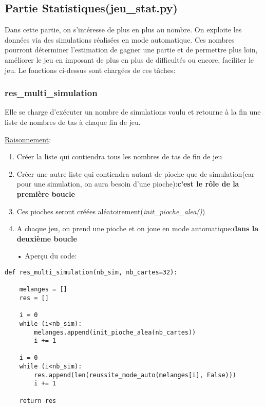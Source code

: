 \subsection{Partie Statistiques(jeu\_stat.py)}
\hspace{\parindent} Dans cette partie, on s'intéresse de plus en plus au nombre. On exploite les données via des simulations réalisées en mode automatique. Ces nombres pourront déterminer l'estimation de gagner une partie et de permettre plus loin, améliorer le jeu en imposant de plus en plus de difficultés ou encore, faciliter le jeu.
Le fonctions ci-dessus sont chargées de ces tâches:
\subsubsection{res\_multi\_simulation}
	Elle se charge d'exécuter un nombre de simulations voulu et retourne à la fin une liste de nombres de tas à chaque fin de jeu.
	\par \underline{Raisonnement}:
	\begin{enumerate}
	\item Créer la liste qui contiendra tous les nombres de tas de fin de jeu
	\item Créer une autre liste qui contiendra autant de pioche que de simulation(car pour une simulation, on aura besoin d'une pioche):\textbf{c'est le rôle de la première boucle}
	\item Ces pioches seront créées aléatoirement(\emph{init\_pioche\_alea()})
	\item A chaque jeu, on prend une pioche et on joue en mode automatique:\textbf{dans la deuxième boucle} \\
	\end{enumerate}
	\begin{itemize}
	\color{blue}\item[•]Aperçu du code:
	\end{itemize}
	
	\lstset{language=Python}
	\lstset{frame=lines}
	\lstset{basicstyle=\footnotesize}
	\begin{lstlisting}
def res_multi_simulation(nb_sim, nb_cartes=32):

    melanges = []
    res = []
    
    i = 0
    while (i<nb_sim):
        melanges.append(init_pioche_alea(nb_cartes))
        i += 1
        
    i = 0
    while (i<nb_sim):
        res.append(len(reussite_mode_auto(melanges[i], False)))
        i += 1
        
    return res
	\end{lstlisting}	
